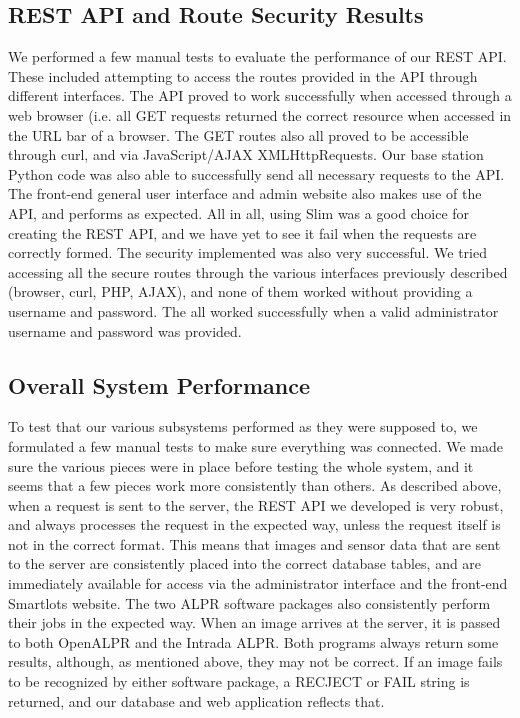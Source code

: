 \documentclass[11pt, oneside, fullpage, doublespace]{article}
\begin{document}
\subsection{REST API and Route Security Results}
We performed a few manual tests to evaluate the performance of our REST API. These included attempting to access the routes provided in the API through different interfaces. The API proved to work successfully when accessed through a web browser (i.e. all GET requests returned the correct resource when accessed in the URL bar of a browser. The GET routes also all proved to be accessible through curl, and via JavaScript/AJAX XMLHttpRequests. Our base station Python code was also able to successfully send all necessary requests to the API. The front-end general user interface and admin website also makes use of the API, and performs as expected. All in all, using Slim was a good choice for creating the REST API, and we have yet to see it fail when the requests are correctly formed. The security implemented was also very successful. We tried accessing all the secure routes through the various interfaces previously described (browser, curl, PHP, AJAX), and none of them worked without providing a username and password. The all worked successfully when a valid administrator username and password was provided.

\subsection{Overall System Performance}
To test that our various subsystems performed as they were supposed to, we formulated a few manual tests to make sure everything was connected. We made sure the various pieces were in place before testing the whole system, and it seems that a few pieces work more consistently than others. As described above, when a request is sent to the server, the REST API we developed is very robust, and always processes the request in the expected way, unless the request itself is not in the correct format. This means that images and sensor data that are sent to the server are consistently placed into the correct database tables, and are immediately available for access via the administrator interface and the front-end Smartlots website. The two ALPR software packages also consistently perform their jobs in the expected way. When an image arrives at the server, it is passed to both OpenALPR and the Intrada ALPR. Both programs always return some results, although, as mentioned above, they may not be correct. If an image fails to be recognized by either software package, a RECJECT or FAIL string is returned, and our database and web application reflects that.
\end{document}
